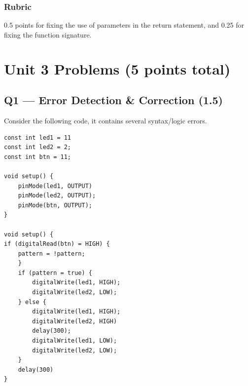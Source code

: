 \documentclass[10pt]{article}
\begin{document}
\subsubsection*{Rubric}
0.5 points for fixing the use of parameters in the return statement, and 0.25 for fixing the function signature.

\section*{Unit 3 Problems (5 points total)}

\subsection*{Q1 — Error Detection \& Correction (1.5)}
Consider the following code, it contains several syntax/logic errors.
\begin{verbatim}
const int led1 = 11
const int led2 = 2;
const int btn = 11;

void setup() {
    pinMode(led1, OUTPUT)
    pinMode(led2, OUTPUT);
    pinMode(btn, OUTPUT);
}

void setup() {
if (digitalRead(btn) = HIGH) {
    pattern = !pattern;
    }
    if (pattern = true) {
        digitalWrite(led1, HIGH);
        digitalWrite(led2, LOW);
    } else {
        digitalWrite(led1, HIGH);
        digitalWrite(led2, HIGH)
        delay(300);
        digitalWrite(led1, LOW);
        digitalWrite(led2, LOW);
    }
    delay(300)
}
\end{verbatim}
\end{document}
